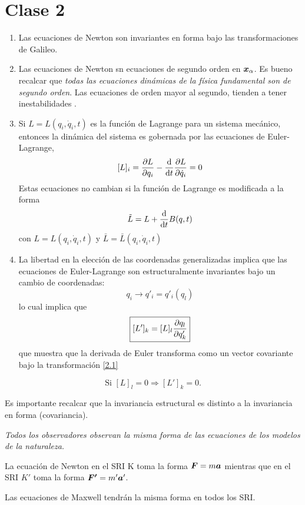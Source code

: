 \section{Clase 2}
\begin{enumerate}
	\item Las ecuaciones de Newton son invariantes en forma bajo las transformaciones de Galileo.
	\item Las ecuaciones de Newton sn ecuaciones de segundo orden en $\vb*{x}_\alpha$. Es bueno recalcar que \textit{todas las ecuaciones dinámicas de la física fundamental son de segundo orden}. Las ecuaciones de orden mayor al segundo, tienden a tener inestabilidades \cite{Ostrogradsky:1850fid}.
	\item Si $L=L(q_i,\dot{q}_i,t)$ es la función de Lagrange para un sistema mecánico, entonces la dinámica del sistema es gobernada por las ecuaciones de Euler-Lagrange,
	\begin{equation}\label{eqs EL}
  [L]_i=\pdv{L}{q_i}-\dv{t}\pdv{L}{\dot{q}_i}=0
\end{equation}
Estas ecuaciones no cambian si la función de Lagrange es modificada a la forma
\begin{equation}
  \tilde{L}=L+\dv{t}B(q,t)
\end{equation}
con $L=L(q_i,\dot{q}_i,t)$ y $\bar{L}=\bar{L}(q_i,\dot{q}_i,t)$
\item La libertad en la elección de las coordenadas generalizadas implica que las ecuaciones de Euler-Lagrange son estructuralmente invariantes bajo un cambio de coordenadas:
\begin{equation}\label{2.1}
  q_i\to q'_i=q'_i(q_l)
\end{equation}
lo cual implica que
\begin{equation}
  \boxed{[L']_k=[L]_l\pdv{q_l}{q'_k}}
\end{equation}
que muestra que la derivada de Euler transforma como un vector covariante bajo la transformación \ref{2.1}
\end{enumerate}
\begin{equation}
  \mbox{Si }[L]_l=0 \Rightarrow [L']_k=0.
\end{equation}

Es importante recalcar que la invariancia estructural es distinto a la invariancia en forma (covariancia).

\textit{Todos los observadores observan la misma forma de las ecuaciones de los modelos de la naturaleza.}

\begin{ej}
	La ecuación de Newton en el SRI K toma la forma $\vb*{F}=m\vb*{a}$ mientras que en el SRI $K'$ toma la forma $\vb*{F'}=m'\vb*{a}'$.
\end{ej}
\begin{ej}
	Las ecuaciones de Maxwell tendrán la misma forma en todos los SRI.
\end{ej}

